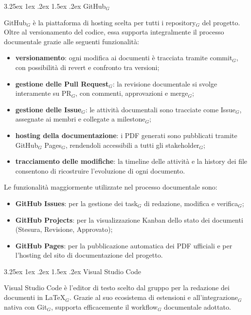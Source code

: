 \documentclass[a4paper, 10pt]{article}
\makeatletter
\renewcommand\paragraph{\@startsection{paragraph}{4}{\z@}%
  {3.25ex \@plus1ex \@minus .2ex}%
  {1.5ex \@plus .2ex}%
  {\normalfont\normalsize\bfseries}}
\makeatother
\begin{document}
\paragraph{GitHub$_G$}

GitHub$_G$ è la piattaforma di hosting scelta per tutti i repository$_G$ del progetto. Oltre al versionamento del codice, essa supporta integralmente il processo documentale grazie alle seguenti funzionalità:
\begin{itemize}
    \item \textbf{versionamento}: ogni modifica ai documenti è tracciata tramite commit$_G$, con possibilità di revert e confronto tra versioni;
    \item \textbf{gestione delle Pull Request$_G$}: la revisione documentale si svolge interamente su PR$_G$, con commenti, approvazioni e merge$_G$;
    \item \textbf{gestione delle Issue$_G$}: le attività documentali sono tracciate come Issue$_G$, assegnate ai membri e collegate a milestone$_G$;
    \item \textbf{hosting della documentazione}: i PDF generati sono pubblicati tramite GitHub$_G$ Pages$_G$, rendendoli accessibili a tutti gli stakeholder$_G$;
    \item \textbf{tracciamento delle modifiche}: la timeline delle attività e la history dei file consentono di ricostruire l'evoluzione di ogni documento.
\end{itemize}

Le funzionalità maggiormente utilizzate nel processo documentale sono:
\begin{itemize}
    \item \textbf{GitHub Issues}: per la gestione dei task$_G$ di redazione, modifica e verifica$_G$;
    \item \textbf{GitHub Projects}: per la visualizzazione Kanban dello stato dei documenti (Stesura, Revisione, Approvato);
    \item \textbf{GitHub Pages}: per la pubblicazione automatica dei PDF ufficiali e per l'hosting del sito di documentazione del progetto.
\end{itemize}

\paragraph{Visual Studio Code}

Visual Studio Code è l'editor di testo scelto dal gruppo per la redazione dei documenti in \LaTeX$_G$. Grazie al suo ecosistema di estensioni e all'integrazione$_G$ nativa con Git$_G$, supporta efficacemente il workflow$_G$ documentale adottato.
\end{document}
